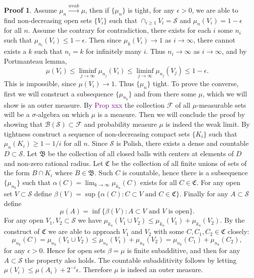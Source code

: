 \documentclass[hidelinks,11pt]{article}
\theoremstyle{definition}
\theoremstyle{dotless}
\newtheorem{prop}{Proof}[section]
\theoremstyle{remark}
\DeclareMathOperator{\1}{\mathbf{1}}
\begin{document}
\begin{prop}
Assume $\mu_n\xrightarrow{weak}\mu$, then if $\{\mu_n\}$ is tight, for any $\epsilon>0$, we are able to find non-decreasing open sets $\{V_i\}$ such that $\cap_{i\geq1}V_i=\mathcal{S}$ and $\mu_n(V_i)=1-\epsilon$ for all $n$. Assume the contrary for contradiction, there exists for each $i$ some $n_i$ such that $\mu_{n_i}(V_i)\leq1-\epsilon$. Then since $\mu_k(V_i)\to1$ as $i\to\infty$, there cannot exists a $k$ such that $n_i=k$ for infinitely many $i$. Thus $n_i\to\infty$ as $i\to\infty$, and by Portmanteau lemma,
\[\mu(V_i)\leq\liminf_{j\to\infty}\mu_{n_j}(V_i)\leq\liminf_{j\to\infty}\mu_{n_j}(V_j)\leq1-\epsilon.\]
This is impossible, since $\mu(V_i)\to1$. Thus $\{\mu_n\}$ tight.\medbreak
To prove the converse, first we will construct a subsequence $\{\mu_{n_k}\}$ and from there some $\mu$, which we will show is an outer measure. By \textcolor{purple}{Prop xxx} the collection $\mathcal{F}$ of all $\mu$-measurable sets will be a $\sigma$-algebra on which $\mu$ is a measure. Then we will conclude the proof by showing that $\mathcal{B}(\mathcal{S})\subset\mathcal{F}$ and probability measure $\mu$ is indeed the weak limit.\medbreak
By tightness construct a sequence of non-decreasing compact sets $\{K_i\}$ such that $\mu_n(K_i)\geq1-1/i$ for all $n$. Since $\mathcal{S}$ is Polish, there exists a dense and countable $D\subset\mathcal{S}$. Let $\mathfrak{B}$ be the collection of all closed balls with centers at elements of $D$ and non-zero rational radius. Let $\mathfrak{C}$ be the collection of all finite unions of sets of the form $B\cap K_i$ where $B\in\mathfrak{B}$. Such $C$ is countable, hence there is a subsequence $\{\mu_{n_k}\}$ such that $\alpha(C)=\lim_{k\to\infty}\mu_{k_n}(C)$ exists for all $C\in\mathfrak{C}$. For any open set $V\subset\mathcal{S}$ define $\beta(V)=\sup\{\alpha(C):C\subset V\textrm{ and }C\in\mathfrak{C}\}$. Finally for any $A\subset\mathcal{S}$ define
\[\mu(A)=\inf\{\beta(V):A\subset V\textrm{ and }V\textrm{ is open}\}.\]
For any open $V_1,V_2\subset\mathcal{S}$ we have $\mu_{k_n}(V_1\cup V_2)\leq\mu_{k_n}(V_1)+\mu_{k_n}(V_2)$. By the construct of $\mathfrak{C}$ we are able to approach $V_1$ and $V_2$ with some $C,C_1,C_2\in\mathfrak{C}$ closely: 
\[\mu_{n_k}(C)=\mu_{n_k}(V_1\cup V_2)\leq\mu_{n_k}(V_1)+\mu_{n_k}(V_2)=\mu_{n_k}(C_1)+\mu_{n_k}(C_2),\]
for any $\epsilon>0$. Hence for open sets $\beta=\mu$ is finite subadditive, and then for any $A\subset\mathcal{S}$ the property also holds. The countable subadditivity follows by letting $\mu(V_i)\leq\mu(A_i)+2^{-i}\epsilon$. Therefore $\mu$ is indeed an outer measure.\medbreak

\end{prop}
\end{document}
